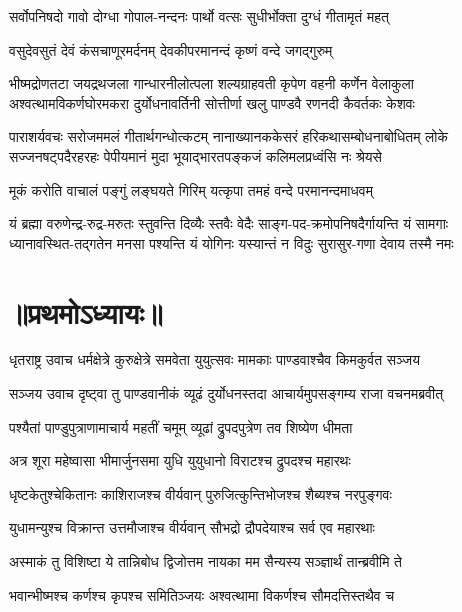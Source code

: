 \twolineshloka
{सर्वोपनिषदो गावो दोग्धा गोपाल-नन्दनः}
{पार्थो वत्सः सुधीर्भोक्ता दुग्धं गीतामृतं महत्}%

\twolineshloka
{वसुदेवसुतं देवं कंसचाणूरमर्दनम्}
{देवकीपरमानन्दं कृष्णं वन्दे जगद्गुरुम्}%

\fourlineindentedshloka
{भीष्मद्रोणतटा जयद्रथजला गान्धारनीलोत्पला}
{शल्यग्राहवती कृपेण वहनी कर्णेन वेलाकुला}
{अश्वत्थामविकर्णघोरमकरा दुर्योधनावर्तिनी}
{सोत्तीर्णा खलु पाण्डवै रणनदी कैवर्तकः केशवः}%

\fourlineindentedshloka
{पाराशर्यवचः सरोजममलं गीतार्थगन्धोत्कटम्}
{नानाख्यानककेसरं हरिकथासम्बोधनाबोधितम्}
{लोके सज्जनषट्‌पदैरहरहः पेपीयमानं मुदा}
{भूयाद्भारतपङ्कजं कलिमलप्रध्वंसि नः श्रेयसे}%

\twolineshloka
{मूकं करोति वाचालं पङ्गुं लङ्घयते गिरिम्}
{यत्कृपा तमहं वन्दे परमानन्दमाधवम्}%

\fourlineindentedshloka
{यं ब्रह्मा वरुणेन्द्र-रुद्र-मरुतः स्तुवन्ति दिव्यैः स्तवैः}
{वेदैः साङ्ग-पद-क्रमोपनिषदैर्गायन्ति यं सामगाः}
{ध्यानावस्थित-तद्गतेन मनसा पश्यन्ति यं योगिनः}
{यस्यान्तं न विदुः सुरासुर-गणा देवाय तस्मै नमः}%

\resetShloka
\section{॥प्रथमोऽध्यायः॥}%
{धृतराष्ट्र उवाच}
\twolineshloka
{धर्मक्षेत्रे कुरुक्षेत्रे समवेता युयुत्सवः}
{मामकाः पाण्डवाश्चैव किमकुर्वत सञ्जय}%

{सञ्जय उवाच}
\twolineshloka
{दृष्ट्वा तु पाण्डवानीकं व्यूढं दुर्योधनस्तदा}
{आचार्यमुपसङ्गम्य राजा वचनमब्रवीत्}%

\twolineshloka
{पश्यैतां पाण्डुपुत्राणामाचार्य महतीं चमूम्}
{व्यूढां द्रुपदपुत्रेण तव शिष्येण धीमता}%

\twolineshloka
{अत्र शूरा महेष्वासा भीमार्जुनसमा युधि}
{युयुधानो विराटश्च द्रुपदश्च महारथः}%

\twolineshloka
{धृष्टकेतुश्चेकितानः काशिराजश्च वीर्यवान्}
{पुरुजित्कुन्तिभोजश्च शैब्यश्च नरपुङ्गवः}%

\twolineshloka
{युधामन्युश्च विक्रान्त उत्तमौजाश्च वीर्यवान्}
{सौभद्रो द्रौपदेयाश्च सर्व एव महारथाः}%

\twolineshloka
{अस्माकं तु विशिष्टा ये तान्निबोध द्विजोत्तम}
{नायका मम सैन्यस्य सञ्ज्ञार्थं तान्ब्रवीमि ते}%

\twolineshloka
{भवान्भीष्मश्च कर्णश्च कृपश्च समितिञ्जयः}
{अश्वत्थामा विकर्णश्च सौमदत्तिस्तथैव च}%

